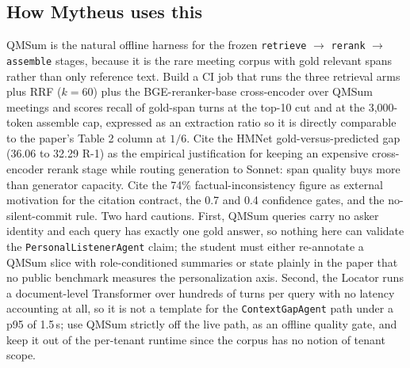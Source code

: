 \subsection{How Mytheus uses this}
\begin{takeaway}
QMSum is the natural offline harness for the frozen \texttt{retrieve} $\to$ \texttt{rerank} $\to$ \texttt{assemble} stages, because it is the rare meeting corpus with gold relevant spans rather than only reference text. Build a CI job that runs the three retrieval arms plus RRF ($k{=}60$) plus the BGE-reranker-base cross-encoder over QMSum meetings and scores recall of gold-span turns at the top-10 cut and at the 3,000-token assemble cap, expressed as an extraction ratio so it is directly comparable to the paper's Table 2 column at $1/6$. Cite the HMNet gold-versus-predicted gap (36.06 to 32.29 R-1) as the empirical justification for keeping an expensive cross-encoder rerank stage while routing generation to Sonnet: span quality buys more than generator capacity. Cite the 74\% factual-inconsistency figure as external motivation for the citation contract, the 0.7 and 0.4 confidence gates, and the no-silent-commit rule. Two hard cautions. First, QMSum queries carry no asker identity and each query has exactly one gold answer, so nothing here can validate the \texttt{PersonalListenerAgent} claim; the student must either re-annotate a QMSum slice with role-conditioned summaries or state plainly in the paper that no public benchmark measures the personalization axis. Second, the Locator runs a document-level Transformer over hundreds of turns per query with no latency accounting at all, so it is not a template for the \texttt{ContextGapAgent} path under a p95 of 1.5\,s; use QMSum strictly off the live path, as an offline quality gate, and keep it out of the per-tenant runtime since the corpus has no notion of tenant scope.
\end{takeaway}

